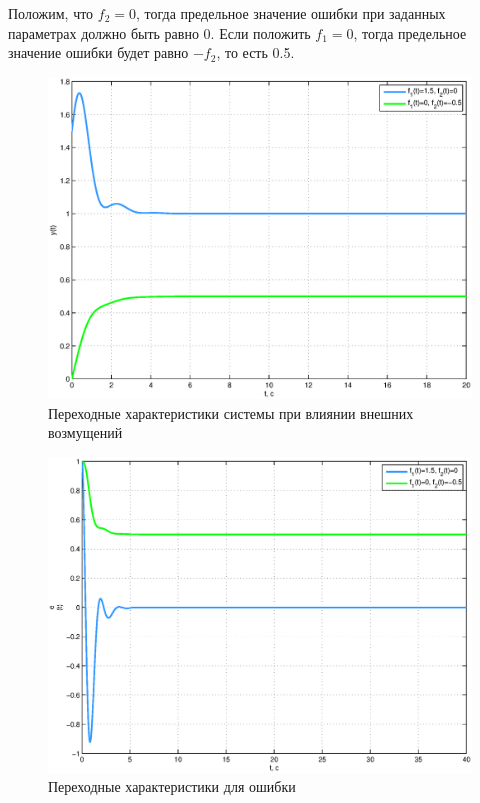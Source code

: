 \documentclass[12pt,a4paper]{article}
\begin{document}
Положим, что $f_2=0$, тогда предельное значение ошибки при заданных параметрах должно быть равно 0. Если положить  $f_1=0$, тогда предельное значение ошибки будет равно $-f_2$, то есть 0.5.
\begin{figure}[H]
    \centering
    \includegraphics[width=0.8\linewidth]{scheme/plot11y.eps}
    \caption{Переходные характеристики системы при влиянии внешних возмущений}
\end{figure}
\begin{figure}[H]
    \centering
    \includegraphics[width=0.8\linewidth]{scheme/plot12e.eps}
    \caption{Переходные характеристики для ошибки}
\end{figure}
\end{document}
